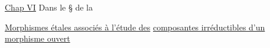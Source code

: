 \uline{Chap VI} Dans le \S{} de la  


\uline{Morphismes étales associés à l'étude des} \uline{composantes irréductibles d'un morphisme ouvert}
